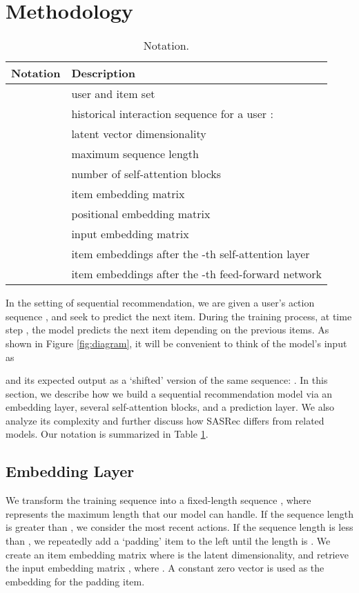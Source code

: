 \documentclass[conference]{IEEEtran}
\begin{document}
\section{Methodology}


\begin{table}[t]
\caption{Notation. \label{tb:notation}}
\begin{tabularx}{\linewidth}{lX}
\toprule
Notation&Description\\
\midrule
        & user and item set\\
                 & historical interaction sequence for a user :  \\
                 & latent vector dimensionality\\
                 & maximum sequence length\\
                 & number of self-attention blocks\\
        & item embedding matrix\\
        & positional embedding matrix\\
        & input embedding matrix\\
   & item embeddings after the -th self-attention layer\\
   & item embeddings after the -th feed-forward network\\
\bottomrule
\end{tabularx}
\end{table}


In the setting of sequential recommendation, we are given a user's action sequence , and seek to predict the next item. During the training process, at time step , the model predicts the next item depending 
on 
the
previous  items. 
As shown in Figure \ref{fig:diagram},
it will be convenient to think of the model's input as
 
and its expected output as a `shifted' version of the same sequence:
. In this section, we describe 
how we build a sequential recommendation model 
via an
embedding layer, several self-attention blocks, and a prediction layer. We also analyze its complexity and further discuss how SASRec differs from related models.
Our notation is summarized in Table \ref{tb:notation}.

\subsection{Embedding Layer}

We transform the training sequence  into a fixed-length sequence , where  represents the maximum length that our model can handle. If the sequence length is greater than , we 
consider
the most recent  actions. If the sequence length is less than , we 
repeatedly
add a `padding' item to the left until the length is . We create an item embedding matrix  where  is the latent dimensionality, and retrieve the input embedding matrix , where .
A constant zero vector  is used as the embedding for the padding item.
\end{document}

